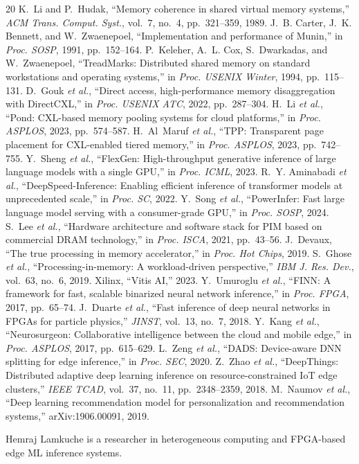 \documentclass[lettersize,journal]{IEEEtran}
\begin{document}
\begin{thebibliography}{20}
 K.~Li and P.~Hudak, ``Memory coherence in shared virtual memory systems,'' \emph{ACM Trans. Comput. Syst.}, vol.~7, no.~4, pp.~321--359, 1989.
 J.~B. Carter, J.~K. Bennett, and W.~Zwaenepoel, ``Implementation and performance of Munin,'' in \emph{Proc. SOSP}, 1991, pp.~152--164.
 P.~Keleher, A.~L. Cox, S.~Dwarkadas, and W.~Zwaenepoel, ``TreadMarks: Distributed shared memory on standard workstations and operating systems,'' in \emph{Proc. USENIX Winter}, 1994, pp.~115--131.
 D.~Gouk \emph{et al.}, ``Direct access, high-performance memory disaggregation with DirectCXL,'' in \emph{Proc. USENIX ATC}, 2022, pp.~287--304.
 H.~Li \emph{et al.}, ``Pond: CXL-based memory pooling systems for cloud platforms,'' in \emph{Proc. ASPLOS}, 2023, pp.~574--587.
 H.~Al~Maruf \emph{et al.}, ``TPP: Transparent page placement for CXL-enabled tiered memory,'' in \emph{Proc. ASPLOS}, 2023, pp.~742--755.
 Y.~Sheng \emph{et al.}, ``FlexGen: High-throughput generative inference of large language models with a single GPU,'' in \emph{Proc. ICML}, 2023.
 R.~Y. Aminabadi \emph{et al.}, ``DeepSpeed-Inference: Enabling efficient inference of transformer models at unprecedented scale,'' in \emph{Proc. SC}, 2022.
 Y.~Song \emph{et al.}, ``PowerInfer: Fast large language model serving with a consumer-grade GPU,'' in \emph{Proc. SOSP}, 2024.
 S.~Lee \emph{et al.}, ``Hardware architecture and software stack for PIM based on commercial DRAM technology,'' in \emph{Proc. ISCA}, 2021, pp.~43--56.
 J.~Devaux, ``The true processing in memory accelerator,'' in \emph{Proc. Hot Chips}, 2019.
 S.~Ghose \emph{et al.}, ``Processing-in-memory: A workload-driven perspective,'' \emph{IBM J. Res. Dev.}, vol.~63, no.~6, 2019.
 Xilinx, ``Vitis AI,'' 2023.
 Y.~Umuroglu \emph{et al.}, ``FINN: A framework for fast, scalable binarized neural network inference,'' in \emph{Proc. FPGA}, 2017, pp.~65--74.
 J.~Duarte \emph{et al.}, ``Fast inference of deep neural networks in FPGAs for particle physics,'' \emph{JINST}, vol.~13, no.~7, 2018.
 Y.~Kang \emph{et al.}, ``Neurosurgeon: Collaborative intelligence between the cloud and mobile edge,'' in \emph{Proc. ASPLOS}, 2017, pp.~615--629.
 L.~Zeng \emph{et al.}, ``DADS: Device-aware DNN splitting for edge inference,'' in \emph{Proc. SEC}, 2020.
 Z.~Zhao \emph{et al.}, ``DeepThings: Distributed adaptive deep learning inference on resource-constrained IoT edge clusters,'' \emph{IEEE TCAD}, vol.~37, no.~11, pp.~2348--2359, 2018.
 M.~Naumov \emph{et al.}, ``Deep learning recommendation model for personalization and recommendation systems,'' arXiv:1906.00091, 2019.
\end{thebibliography}

\begin{IEEEbiographynophoto}{Hemraj Lamkuche}
is a researcher in heterogeneous computing and FPGA-based edge ML inference systems.
\end{IEEEbiographynophoto}
\end{document}
